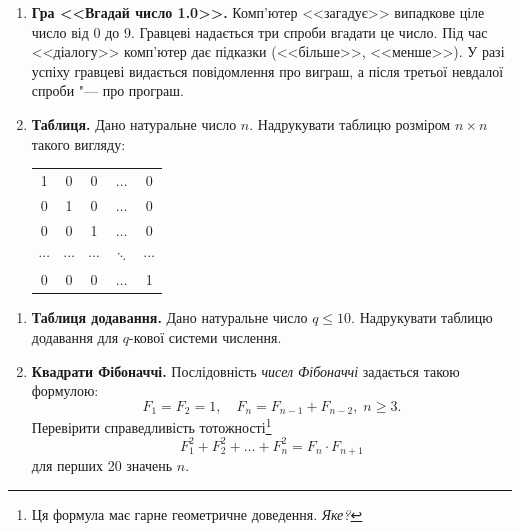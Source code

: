  


\begin{enumerate}
\item {\bfseries Гра <<Вгадай число 1.0>>.} Комп'ютер <<загадує>> випадкове ціле число від 0 до 9. Гравцеві надається три спроби вгадати це число. Під час <<діалогу>> комп'ютер дає підказки (<<більше>>, <<менше>>). У разі успіху гравцеві видається повідомлення про виграш, а після третьої невдалої спроби  "--- про програш.
\item \textbf{Таблиця.} Дано натуральне число $n$. Надрукувати таблицю роз\-мі\-ром $n\times n$ такого вигляду:
{\ttfamily
\begin{center}
\setlength{\tabcolsep}{6pt}
\begin{tabular}{ccccc}
1 & 0 & 0 & $\ldots$ & 0 \\
0 & 1 & 0 & $\ldots$ & 0 \\
0 & 0 & 1 & $\ldots$ & 0 \\
$\cdots$ & $\cdots$ & $\cdots$ & $\ddots$ & $\cdots$ \\
0 & 0 & 0 & $\ldots$ & 1
\end{tabular}
\end{center}
}
\end{enumerate}

 


\begin{enumerate}
\item \textbf{Таблиця додавання.} Дано натуральне число $q\leqslant 10$. Надрукувати таблицю додавання для $q$-кової системи числення.
\item \textbf{Квадрати Фібоначчі.} Послідовність {\itshape чисел Фібоначчі} задається такою формулою:
$$
F_1=F_2=1,\quad F_{n}=F_{n-1}+F_{n-2}, \; n \geqslant 3.
$$
Перевірити справедливість тотожності\footnote[1]{Ця формула має гарне геометричне доведення. {\itshape Яке?}}
$$
F_1^2+F_2^2+\ldots+F_n^2=F_{n}\cdot F_{n+1}
$$
для перших 20 значень $n$.


\end{enumerate}

 


